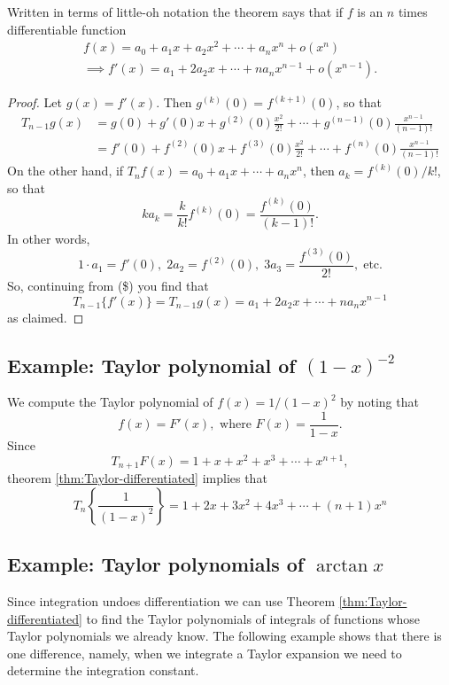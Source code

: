 Written in terms of little-oh notation the theorem says that if $f$ is an $n$
times differentiable function 
\begin{multline*}
  f(x) = a_0+a_1x+a_2x^2+\cdots+a_nx^n + o(x^n) \\
  \implies 
  f'(x) = a_1+2a_2x+\cdots+na_nx^{n-1}+o(x^{n-1}).
\end{multline*}

\begin{proof}
  Let $g(x)=f'(x)$. Then $g^{(k)} (0)=f^{(k+1)} (0)$, so that
  \begin{align*}
    T_{n-1}g(x) &= g(0)+g'(0)x+g^{(2)} (0)\frac{x^2}{2!}
    +\cdots+g^{(n-1)} (0)\frac{x^{n-1}}{(n-1)!}\\
    &=f'(0)+f^{(2)} (0)x+f^{(3)} (0)\frac{x^2}{2!}  +\cdots+f^{(n)}
    (0)\frac{x^{n-1}}{(n-1)!}\tag{\$}
  \end{align*}
  On the other hand, if $T_nf(x) = a_0+a_1x+\cdots+a_nx^n$, then
  $a_k=f^{(k)} (0)/k!$, so that
  \[
  ka_k=\frac k{k!}f^{(k)} (0) = \frac{f^{(k)} (0)}{(k-1)!}.
  \]
  In other words,
  \[
  1\cdot a_1=f' (0), \; 2a_2 = f^{(2)} (0),\; 3a_3 = \frac{f^{(3)}
  (0)}{2!},\;\text{etc.}
  \]
  So, continuing from (\$) you find that
  \[
  T_{n-1}\{f'(x)\}=T_{n-1}g(x)=a_1+2a_2x+\cdots+na_nx^{n-1}
  \]
  as claimed.
\end{proof}
\subsection{Example: Taylor polynomial of $(1-x)^{-2}$} %
We compute the Taylor polynomial of $f (x)= 1/ (1-x)^2$ by noting that
\[
f(x)=F'(x), \text{ where } F(x)=\frac1{1-x}.
\]
Since
\[
T_{n+1}F(x) = 1+x+x^2+x^3+\cdots+ x^{n+1},
\]
theorem \ref{thm:Taylor-differentiated} implies that
\[
T_n \left\{\frac1{(1-x)^2}\right\} = 1+2x+3x^2+4x^3+\cdots+(n+1)x^n
\]

\subsection{Example: Taylor polynomials of $\arctan x$} %
Since integration undoes differentiation we can use Theorem
\ref{thm:Taylor-differentiated} to find the Taylor polynomials  of integrals of
functions whose Taylor polynomials we already know.  The following example shows
that there is one difference, namely, when we integrate a Taylor expansion we
need to determine the integration constant.

